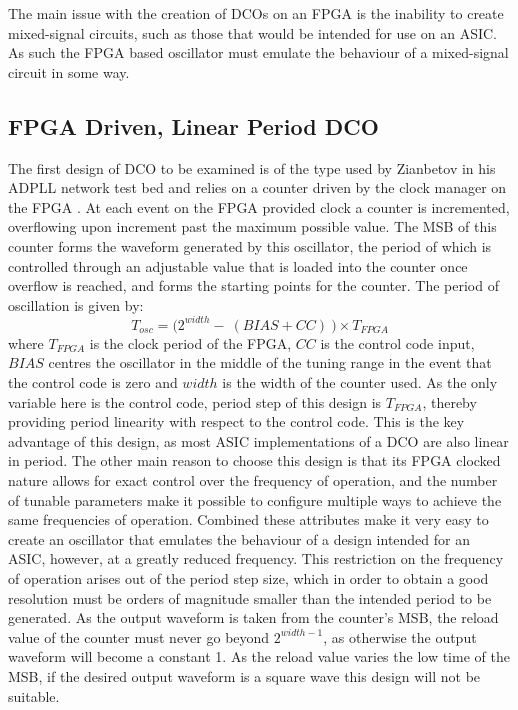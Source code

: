 The main issue with the creation of \ac{DCO}s on an \ac{FPGA} is the inability to create mixed-signal circuits, such as those that would be intended for use on an \ac{ASIC}. As such the \ac{FPGA} based oscillator must emulate the behaviour of a mixed-signal circuit in some way.

\subsection{\acs{FPGA} Driven, Linear Period \acs{DCO}}
The first design of \ac{DCO} to be examined is of the type used by Zianbetov in his \ac{ADPLL} network test bed and relies on a counter driven by the clock manager on the \ac{FPGA} \cite{zianbetov2013phd}. At each event on the \ac{FPGA} provided clock a counter is incremented, overflowing upon increment past the maximum possible value. The \ac{MSB} of this counter forms the waveform generated by this oscillator, the period of which is controlled through an adjustable value that is loaded into the counter once overflow is reached, and forms the starting points for the counter. The period of oscillation is given by:
\begin{equation}
	T_{osc} = \big(2^{width} -~(BIAS+CC)~\big)\times T_{FPGA}
\end{equation}
where $T_{FPGA}$ is the clock period of the \ac{FPGA}, $CC$ is the control code input, $BIAS$ centres the oscillator in the middle of the tuning range in the event that the control code is zero and $width$ is the width of the counter used. As the only variable here is the control code, period step of this design is $T_{FPGA}$, thereby providing period linearity with respect to the control code. This is the key advantage of this design, as most \ac{ASIC} implementations of a \ac{DCO} are also linear in period. The other main reason to choose this design is that its \ac{FPGA} clocked nature allows for exact control over the frequency of operation, and the number of tunable parameters make it possible to configure multiple ways to achieve the same frequencies of operation. Combined these attributes make it very easy to create an oscillator that emulates the behaviour of a design intended for an \ac{ASIC}, however, at a greatly reduced frequency. This restriction on the frequency of operation arises out of the period step size, which in order to obtain a good resolution must be orders of magnitude smaller than the intended period to be generated. As the output waveform is taken from the counter's \ac{MSB}, the reload value of the counter must never go beyond $2^{width-1}$, as otherwise the output waveform will become a constant 1. As the reload value varies the low time of the \ac{MSB}, if the desired output waveform is a square wave this design will not be suitable.

